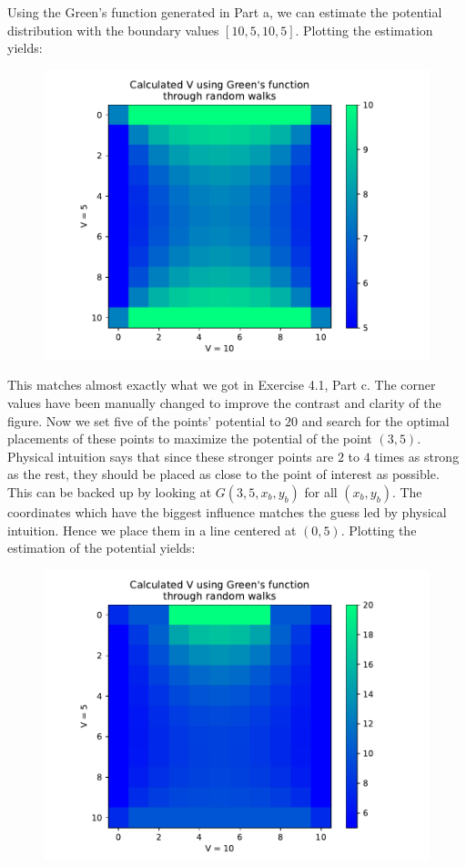 \documentclass[a4paper,12pt]{article}
\begin{document}
Using the Green's function generated in Part a, we can estimate the potential distribution with the boundary values
$[10, 5, 10, 5]$. Plotting the estimation yields:

\begin{figure}[!ht]
  \centering
  \includegraphics[scale=0.49]{img/4_4b_VfromG.pdf}
\end{figure}

This matches almost exactly what we got in Exercise 4.1, Part c. The corner values have been manually changed to
improve the contrast and clarity of the figure. Now we set five of the points' potential to $20$ and search for the
optimal placements of these points to maximize the potential of the point $(3, 5)$. Physical intuition says that
since these stronger points are $2$ to $4$ times as strong as the rest, they should be placed as close to the point
of interest as possible. This can be backed up by looking at $G(3, 5, x_b, y_b)$ for all $(x_b, y_b)$. The coordinates
which have the biggest influence matches the guess led by physical intuition. Hence we place them in a line centered
at $(0, 5)$. Plotting the estimation of the potential yields:

\begin{figure}[!ht]
  \centering
  \includegraphics[scale=0.49]{img/4_4b_1_VfromG.pdf}
\end{figure}
\end{document}
